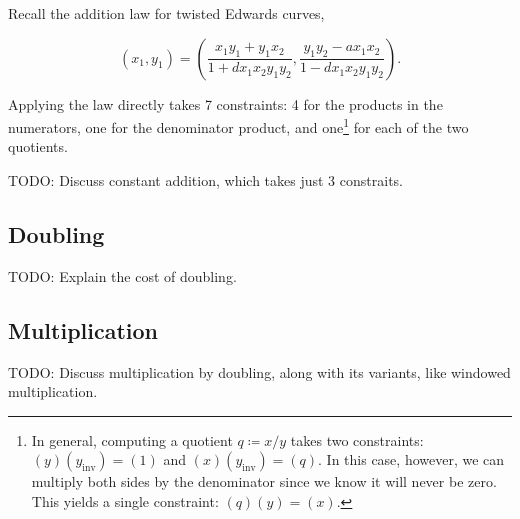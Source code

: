 \documentclass{article}
\begin{document}
Recall the addition law for twisted Edwards curves,

\begin{equation}
  (x_1, y_1) = \left( \frac{x_1 y_1 + y_1 x_2}{1 + d x_1 x_2 y_1 y_2}, \frac{y_1 y_2 - a x_1 x_2}{1 - d x_1 x_2 y_1 y_2} \right).
\end{equation}

Applying the law directly takes 7 constraints: 4 for the products in the numerators, one for the denominator product, and one\footnote{In general, computing a quotient $q \coloneqq x / y$ takes two constraints: $(y) (y_\mathrm{inv}) = (1)$ and $(x) (y_\mathrm{inv}) = (q)$. In this case, however, we can multiply both sides by the denominator since we know it will never be zero. This yields a single constraint: $(q) (y) = (x)$.} for each of the two quotients.

TODO: Discuss constant addition, which takes just 3 constraits.


\subsection{Doubling}

TODO: Explain the cost of doubling.


\subsection{Multiplication}

TODO: Discuss multiplication by doubling, along with its variants, like windowed multiplication.




{}

\end{document}
